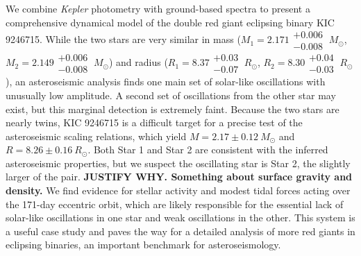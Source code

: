 We combine \emph{Kepler} photometry with ground-based spectra to present a comprehensive dynamical model of the double red giant eclipsing binary KIC 9246715. While the two stars are very similar in mass ($M_1 = 2.171\substack{+0.006 \\ -0.008} \ M_{\odot}$, $M_2 = 2.149\substack{+0.006 \\ -0.008} \ M_{\odot}$) and radius ($R_1 = 8.37\substack{+0.03 \\ -0.07} \ R_{\odot}$, $R_2 = 8.30\substack{+0.04 \\ -0.03} \ R_{\odot}$), an asteroseismic analysis finds one main set of solar-like oscillations with unusually low amplitude. A second set of oscillations from the other star may exist, but this marginal detection is extremely faint. Because the two stars are nearly twins, KIC 9246715 is a difficult target for a precise test of the asteroseismic scaling relations, which yield $M = 2.17\pm0.12 \ M_{\odot}$ and $R = 8.26\pm0.16 \ R_{\odot}$. Both Star 1 and Star 2 are consistent with the inferred asteroseismic properties, but we suspect the oscillating star is Star 2, the slightly larger of the pair. \textbf{JUSTIFY WHY. Something about surface gravity and density.} We find evidence for stellar activity and modest tidal forces acting over the 171-day eccentric orbit, which are likely responsible for the essential lack of solar-like oscillations in one star and weak oscillations in the other.  This system is a useful case study and paves the way for a detailed analysis of more red giants in eclipsing binaries, an important benchmark for asteroseismology.
  
  
  
  
  